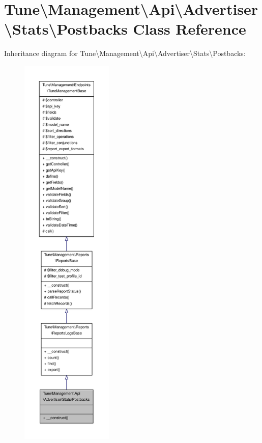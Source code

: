 \hypertarget{classTune_1_1Management_1_1Api_1_1Advertiser_1_1Stats_1_1Postbacks}{\section{Tune\textbackslash{}Management\textbackslash{}Api\textbackslash{}Advertiser\textbackslash{}Stats\textbackslash{}Postbacks Class Reference}
\label{classTune_1_1Management_1_1Api_1_1Advertiser_1_1Stats_1_1Postbacks}
}


Inheritance diagram for Tune\textbackslash{}Management\textbackslash{}Api\textbackslash{}Advertiser\textbackslash{}Stats\textbackslash{}Postbacks\-:
\nopagebreak
\begin{figure}[H]
\begin{center}
\leavevmode
\includegraphics[height=550pt]{classTune_1_1Management_1_1Api_1_1Advertiser_1_1Stats_1_1Postbacks__inherit__graph}
\end{center}
\end{figure}


